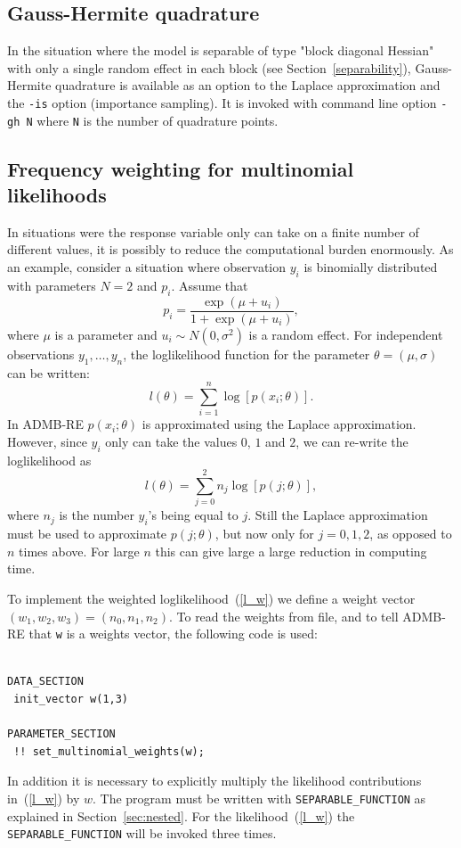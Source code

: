\documentclass[12pt,letter,reqno]{book}
\begin{document}
\subsection{Gauss-Hermite quadrature}
In the situation where the model is separable of type "block diagonal Hessian" with only a single
random effect in each block (see Section~\ref{separability}), Gauss-Hermite quadrature
is available as an option to the Laplace approximation and the \texttt{-is} option (importance sampling).
It is invoked with command line option \texttt{-gh N} where \texttt{N} is the number of quadrature points.

\subsection{Frequency weighting for multinomial likelihoods}
In situations were the response variable only can take on a finite
number of different values, it is possibly to reduce the computational burden
enormously. As an example, consider a situation where observation $y_{i}$ 
is binomially distributed with parameters $N=2$ and $p_{i}$. Assume that
$$
  p_{i}=\frac{\exp (\mu +u_{i})}{1+\exp (\mu +u_{i})},
$$
where $\mu $ is a parameter and $u_{i}\sim N(0,\sigma ^{2})$ is a random
effect. For independent observations $y_1,\ldots,y_n$, 
the loglikelihood function for the parameter 
$\theta =(\mu ,\sigma )$ can be written:
\begin{equation}
  l(\theta )=\sum_{i=1}^{n}\log \left[ p(x_{i};\theta )\right] .
\end{equation}
In ADMB-RE $p(x_{i};\theta)$ is approximated using the Laplace approximation. 
However, since $y_i$ only can take the values $0$, $1$ and $2$, we can 
re-write the loglikelihood as 
$$
l(\theta )=\sum_{j=0}^{2}n_{j}\log \left[ p(j;\theta )\right] ,  
$$
where $n_j$ is the number $y_i$'s being equal to $j$. Still the Laplace
approximation must be used to approximate $p(j;\theta )$, but now only for $%
j=0,1,2$, as opposed to $n$ times above. For large $n$ this can give large
a large reduction in computing time.

To implement the weighted loglikelihood~(\ref{l_w}) we define a weight 
vector $(w_1,w_2,w_3)=(n_{0},n_{1},n_{2})$. To read the weights from file, 
and to tell ADMB-RE that \texttt{w} is a weights vector, the following code is used:
\begin{lstlisting}

DATA_SECTION
 init_vector w(1,3)		

PARAMETER_SECTION
 !! set_multinomial_weights(w);

\end{lstlisting}
In addition it is necessary to explicitly multiply the likelihood contributions
in~(\ref{l_w}) by $w$. The program must be written with \texttt{SEPARABLE\_FUNCTION} as 
explained in Section~\ref{sec:nested}. For the likelihood~(\ref{l_w})
the \texttt{SEPARABLE\_FUNCTION} will be invoked three times.
\end{document}
